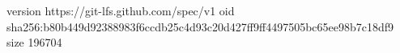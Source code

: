 version https://git-lfs.github.com/spec/v1
oid sha256:b80b449d92388983f6ccdb25c4d93c20d427ff9ff4497505bc65ee98b7c18df9
size 196704
